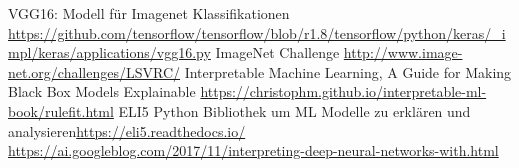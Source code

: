 \documentclass[
  12pt, %
  a4paper, %
  oneside, %
  openany, 
  numbers=noenddot, %
  BCOR=5mm, %
  parskip=half*, %
  thesis, %
]{bfhbook}
\begin{document}
\renewcommand\bibname{Linkverzeichnis}
\begin{thebibliography}{99}\label{links}
    VGG16: Modell für Imagenet Klassifikationen \break \url{https://github.com/tensorflow/tensorflow/blob/r1.8/tensorflow/python/keras/_impl/keras/applications/vgg16.py}
    ImageNet Challenge \break \url{http://www.image-net.org/challenges/LSVRC/}
   Interpretable Machine Learning, A Guide for Making Black Box Models Explainable \break \url{https://christophm.github.io/interpretable-ml-book/rulefit.html}
    ELI5 Python Bibliothek um \Gls{ML} Modelle zu erklären und analysieren\break \url{https://eli5.readthedocs.io/}
    \break \url{https://ai.googleblog.com/2017/11/interpreting-deep-neural-networks-with.html}
\end{thebibliography}
\lstlistoflistings
\endgroup
\end{document}
